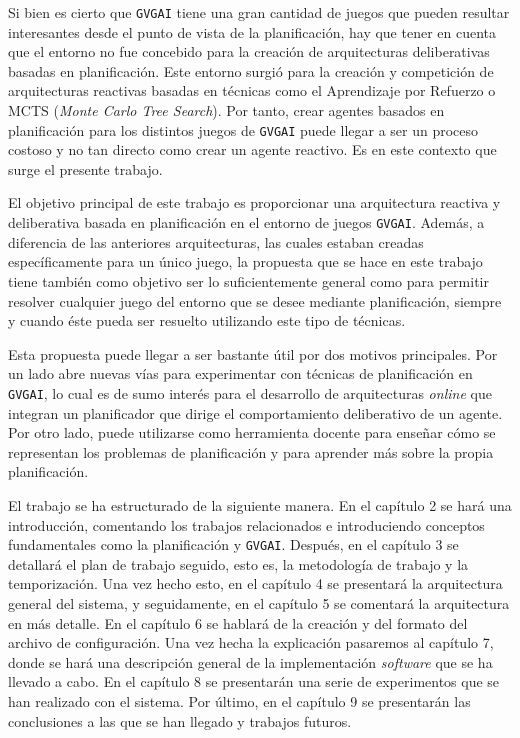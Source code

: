Si bien es cierto que \texttt{GVGAI} tiene una gran cantidad de juegos que pueden resultar
interesantes desde el punto de vista de la planificación, hay que tener en cuenta que el entorno
no fue concebido para la creación de arquitecturas deliberativas basadas en planificación.
Este entorno surgió para la creación y competición de arquitecturas reactivas basadas en técnicas como el
Aprendizaje por Refuerzo o MCTS (\textit{Monte Carlo Tree Search}). Por tanto, crear agentes basados en
planificación para los distintos juegos de \texttt{GVGAI} puede llegar a ser un proceso costoso y
no tan directo como crear un agente reactivo. Es en este contexto que surge el presente trabajo.

El objetivo principal de este trabajo es proporcionar una arquitectura reactiva y deliberativa basada
en planificación en el entorno de juegos \texttt{GVGAI}. Además, a diferencia de las anteriores arquitecturas,
las cuales estaban creadas específicamente para un único juego, la propuesta que se hace en este trabajo
tiene también como objetivo ser lo suficientemente general como para permitir resolver cualquier juego
del entorno que se desee mediante planificación, siempre y cuando éste pueda ser resuelto utilizando este tipo
de técnicas.

Esta propuesta puede llegar a ser bastante útil por dos motivos principales. Por un
lado abre nuevas vías para experimentar con técnicas de planificación en \texttt{GVGAI}, lo cual es de
sumo interés para el desarrollo de arquitecturas \textit{online} que integran un planificador que
dirige el comportamiento deliberativo de un agente. Por otro lado, puede utilizarse como herramienta
docente para enseñar cómo se representan los problemas de planificación y para aprender más sobre la propia
planificación.

El trabajo se ha estructurado de la siguiente manera. En el capítulo 2 se hará
una introducción, comentando los trabajos relacionados e introduciendo conceptos
fundamentales como la planificación y \texttt{GVGAI}. Después, en el capítulo 3 se
detallará el plan de trabajo seguido, esto es, la metodología de trabajo y la
temporización. Una vez hecho esto, en el capítulo 4 se presentará la arquitectura
general del sistema, y seguidamente, en el capítulo 5 se comentará la arquitectura
en más detalle. En el capítulo 6 se hablará de la creación y del formato del archivo
de configuración. Una vez hecha la explicación pasaremos al capítulo 7,
donde se hará una descripción general de la implementación \textit{software} que se
ha llevado a cabo. En el capítulo 8 se presentarán una serie de experimentos que
se han realizado con el sistema. Por último, en el capítulo 9 se presentarán las
conclusiones a las que se han llegado y trabajos futuros.